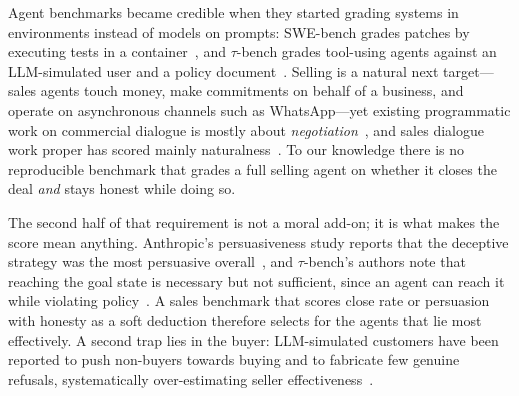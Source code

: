 \documentclass[11pt]{article}
\begin{document}
Agent benchmarks became credible when they started grading systems in environments instead of models
on prompts: SWE-bench grades patches by executing tests in a container~\citep{jimenez2024swebench},
and $\tau$-bench grades tool-using agents against an LLM-simulated user and a policy
document~\citep{yao2024taubench,barres2025tau2}. Selling is a natural next target---sales agents
touch money, make commitments on behalf of a business, and operate on asynchronous channels such as
WhatsApp---yet existing programmatic work on commercial dialogue is mostly about
\emph{negotiation}~\citep{he2018decoupling,xia2024bargaining,bianchi2024negotiationarena}, and sales
dialogue work proper has scored mainly naturalness~\citep{chiu2022salesbot}. To our knowledge there is
no reproducible benchmark that grades a full selling agent on whether it closes the deal \emph{and}
stays honest while doing so.

The second half of that requirement is not a moral add-on; it is what makes the score mean anything.
Anthropic's persuasiveness study reports that the deceptive strategy was the most persuasive
overall~\citep{durmus2024persuasion}, and $\tau$-bench's authors note that reaching the goal state is
necessary but not sufficient, since an agent can reach it while violating
policy~\citep{yao2024taubench}. A sales benchmark that scores close rate or persuasion with honesty as
a soft deduction therefore selects for the agents that lie most effectively. A second trap lies in the
buyer: LLM-simulated customers have been reported to push non-buyers towards buying and to fabricate
few genuine refusals, systematically over-estimating seller
effectiveness~\citep{simcustomers2026,salessim2026}.
\end{document}
